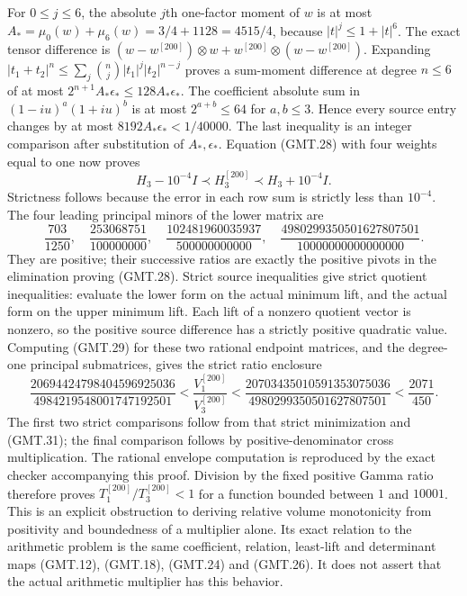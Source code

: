 For $0\le j\le6$, the absolute $j$th one-factor moment of $w$
is at most $A_*=\mu_0(w)+\mu_6(w)=3/4+1128=4515/4$,
because $|t|^j\le1+|t|^6$.
The exact tensor difference is
$(w-w^{[200]})\otimes w+w^{[200]}\otimes(w-w^{[200]})$.
Expanding $|t_1+t_2|^n\le\sum_j\binom nj|t_1|^j|t_2|^{n-j}$
proves a sum-moment difference at degree $n\le6$ of at most
$2^{n+1}A_*\epsilon_*\le128A_*\epsilon_*$.
The coefficient absolute sum in $(1-iu)^a(1+iu)^b$ is at most
$2^{a+b}\le64$ for $a,b\le3$. Hence every source entry changes
by at most $8192A_*\epsilon_*<1/40000$. The last inequality is
an integer comparison after substitution of $A_*,\epsilon_*$.
Equation (GMT.28) with four weights equal to one now proves
\[
H_3-10^{-4}I\prec H_3^{[200]}\prec H_3+10^{-4}I.             \tag{GMT.41}
\]
Strictness follows because the error in each row sum is strictly less
than $10^{-4}$. The four leading principal minors of the lower matrix are
\[
 \frac{703}{1250},\quad\frac{253068751}{100000000},\quad
 \frac{102481960035937}{500000000000},\quad
 \frac{4980299350501627807501}{10000000000000000}.
\]
They are positive; their successive ratios are exactly the positive
pivots in the elimination proving (GMT.28). Strict source inequalities
give strict quotient inequalities: evaluate the lower form on the
actual minimum lift, and the actual form on the upper minimum lift.
Each lift of a nonzero quotient vector is nonzero, so the positive
source difference has a strictly positive quadratic value. Computing (GMT.29) for
these two rational endpoint matrices, and the degree-one principal
submatrices, gives the strict ratio enclosure
\[
 \frac{20694424798404596925036}{4984219548001747192501}
 <\frac{V_1^{[200]}}{V_3^{[200]}}
 <\frac{20703435010591353075036}{4980299350501627807501}
 <\frac{2071}{450}.                                          \tag{GMT.42}
\]
The first two strict comparisons follow from that strict minimization
and (GMT.31); the final comparison follows by positive-denominator
cross multiplication. The rational envelope computation is reproduced by the
exact checker accompanying this proof. Division by the fixed positive
Gamma ratio therefore proves
$T_1^{[200]}/T_3^{[200]}<1$ for a function bounded between $1$
and $10001$. This is an explicit obstruction to deriving relative
volume monotonicity from positivity and boundedness of a multiplier
alone. Its exact relation to the arithmetic problem is the same
coefficient, relation, least-lift and determinant maps
(GMT.12), (GMT.18), (GMT.24) and (GMT.26). It does not assert that
the actual arithmetic multiplier has this behavior.


